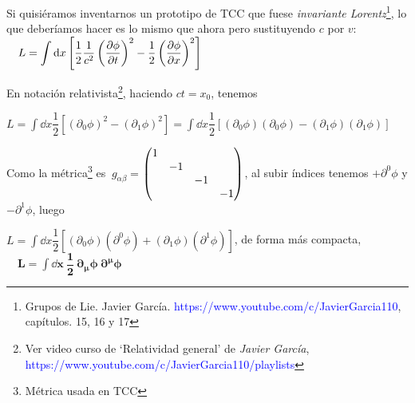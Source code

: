 \vspace{5mm}

\begin{ejemplo}
\begin{small}	
	Si quisiéramos inventarnos un prototipo de TCC que fuese \emph{invariante Lorentz}\footnote{Grupos de Lie. Javier García.  \textcolor{blue}{https://www.youtube.com/c/JavierGarcia110}, capítulos. 15, 16 y 17}, lo que deberíamos hacer es lo mismo que ahora pero sustituyendo $c$ por $v$:
	$\quad \displaystyle L=\int \dd x \left[ \dfrac 1 2 \dfrac 1 {c^2} \left( \pdv{\phi}{t} \right)^2 - \dfrac 1 2 \left( \pdv{\phi}{x} \right)^2 \right] $
	
	En notación relativista\footnote{Ver video curso de `Relatividad general' de 	\emph{Javier García},  \textcolor{blue}{https://www.youtube.com/c/JavierGarcia110/playlists}}, haciendo $ct=x_0$, tenemos 
	
$\displaystyle L=\int \dd x \dfrac 1 2 \left[ (\partial_0\phi)^2-(\partial_1 \phi)^2 \right]= 
\int \dd x \dfrac 1 2 \left[ (\partial_0\phi)(\partial_0\phi)-(\partial_1 \phi)(\partial_1 \phi) \right]$

Como la métrica\footnote{Métrica usada en TCC} es  $\ g_{\alpha \beta} = $\tiny{$\mqty(\dmat{1,-1,-1,-1})$}\normalsize{,} al subir índices tenemos $+\partial^0 \phi$ y $-\partial^1 \phi$, luego

$L=\displaystyle \int \dd x \dfrac 1 2 [(\partial_0\phi)(\partial^0\phi)+(\partial_1\phi)(\partial^1\phi)]$, de forma más compacta, $\quad \boldsymbol{ L=\displaystyle \int \dd x \ \dfrac 1 2 \ \partial_\mu\phi \ \partial^\mu\phi }$
\end{small}
\end{ejemplo}
















